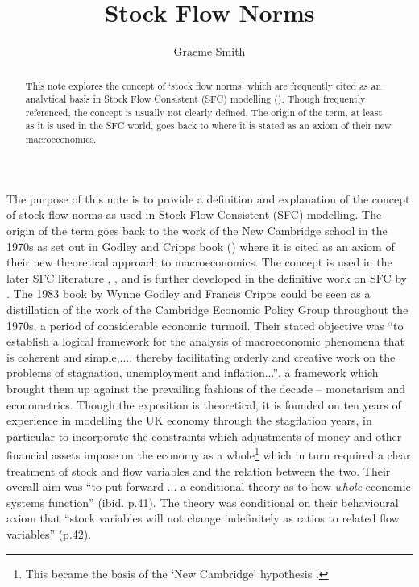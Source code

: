 \documentclass[twoside,a4paper,11pt]{article}
\title{Stock Flow Norms}
\author{Graeme Smith}
\begin{document}
\maketitle
\begin{abstract} This note explores the concept of `stock flow norms' which are frequently cited as an analytical basis in Stock Flow Consistent (SFC) modelling (\cite{Godley2007}). Though frequently referenced, the concept is usually not clearly defined. The origin of the term, at least as it is used in the SFC world, goes back to \cite{Godley1983} where it is stated as an axiom of their new macroeconomics. 
\end{abstract}

The purpose of this note is to provide a definition and explanation of the concept of stock flow norms as used in Stock Flow Consistent (SFC) modelling. The origin of the term goes back to the work of the New Cambridge school in the 1970s as set out in Godley and Cripps book (\cite{Godley1983}) where it is cited as an axiom of their new theoretical approach to macroeconomics. The concept is used in the later SFC  literature \cite{Godley1999b}, \cite{Zezza2003}, \cite{Correa2006} and is further developed in the definitive work on SFC by \cite{Godley2007}. The  1983 book by Wynne Godley and Francis Cripps could be seen as a distillation of the work of the Cambridge Economic Policy Group throughout the 1970s, a period of considerable economic turmoil. Their stated objective was ``to establish a logical framework for the analysis of macroeconomic phenomena that is coherent and simple,..., thereby facilitating orderly and creative work on the problems of stagnation, unemployment and inflation...'', a framework which brought them up against the prevailing fashions of the decade -- monetarism and econometrics. Though the exposition is theoretical, it is founded on ten years of experience in modelling the UK economy through the stagflation years, in particular to incorporate the constraints which adjustments of money and other financial assets impose on the economy as a whole\footnote{This became the basis of the `New Cambridge' hypothesis \cite{Cripps1976}.} which in turn required a clear treatment of stock and flow variables and the relation between the two. Their overall aim was ``to put forward ... a conditional theory as to how \emph{whole} economic systems function'' (ibid. p.41). The theory was conditional on their behavioural axiom that ``stock variables will not change indefinitely as ratios to related flow variables'' (p.42). 
\end{document}
